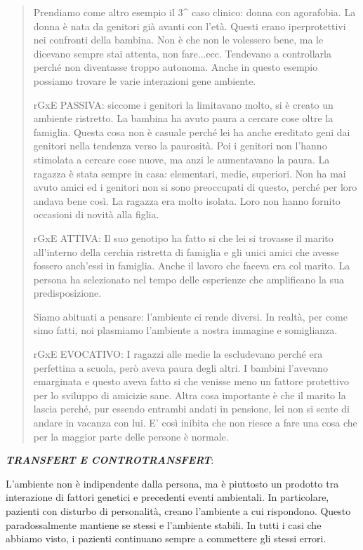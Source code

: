 \documentclass[]{article}
\begin{document}
\begin{quote}
Prendiamo come altro esempio il 3\^{} caso clinico: donna con
agorafobia. La donna è nata da genitori già avanti con l'età. Questi
erano iperprotettivi nei confronti della bambina. Non è che non le
volessero bene, ma le dicevano sempre stai attenta, non fare...ecc.
Tendevano a controllarla perché non diventasse troppo autonoma. Anche in
questo esempio possiamo trovare le varie interazioni gene ambiente.

rGxE PASSIVA: siccome i genitori la limitavano molto, si è creato un
ambiente ristretto. La bambina ha avuto paura a cercare cose oltre la
famiglia. Questa cosa non è casuale perché lei ha anche ereditato geni
dai genitori nella tendenza verso la paurosità. Poi i genitori non
l'hanno stimolata a cercare cose nuove, ma anzi le aumentavano la paura.
La ragazza è stata sempre in casa: elementari, medie, superiori. Non ha
mai avuto amici ed i genitori non si sono preoccupati di questo, perché
per loro andava bene così. La ragazza era molto isolata. Loro non hanno
fornito occasioni di novità alla figlia.

rGxE ATTIVA: Il suo genotipo ha fatto si che lei si trovasse il marito
all'interno della cerchia ristretta di famiglia e gli unici amici che
avesse fossero anch'essi in famiglia. Anche il lavoro che faceva era col
marito. La persona ha selezionato nel tempo delle esperienze che
amplificano la sua predisposizione.

Siamo abituati a pensare: l'ambiente ci rende diversi. In realtà, per
come simo fatti, noi plasmiamo l'ambiente a nostra immagine e
somiglianza.

rGxE EVOCATIVO: I ragazzi alle medie la escludevano perché era
perfettina a scuola, però aveva paura degli altri. I bambini l'avevano
emarginata e questo aveva fatto si che venisse meno un fattore
protettivo per lo sviluppo di amicizie sane. Altra cosa importante è che
il marito la lascia perché, pur essendo entrambi andati in pensione, lei
non si sente di andare in vacanza con lui. E' così inibita che non
riesce a fare una cosa che per la maggior parte delle persone è normale.
\end{quote}

\textbf{\emph{TRANSFERT E CONTROTRANSFERT}}:

L'ambiente non è indipendente dalla persona, ma è piuttosto un prodotto
tra interazione di fattori genetici e precedenti eventi ambientali. In
particolare, pazienti con disturbo di personalità, creano l'ambiente a
cui rispondono. Questo paradossalmente mantiene se stessi e l'ambiente
stabili. In tutti i casi che abbiamo visto, i pazienti continuano sempre
a commettere gli stessi errori.
\end{document}
